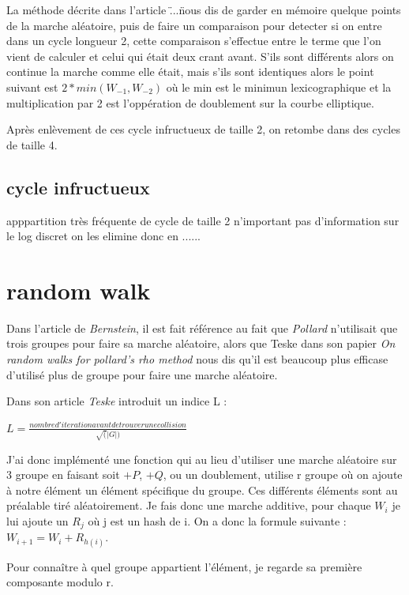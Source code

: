 \documentclass[a4paper,10pt]{report}
\begin{document}
La méthode décrite dans l'article \" ...\" nous dis de garder en mémoire quelque points de la marche aléatoire, puis de faire un comparaison pour detecter si on entre dans un cycle
longueur 2, cette comparaison s'effectue entre le terme que l'on vient de calculer et celui qui était deux crant avant.
S'ils sont différents alors on continue la marche comme elle était, mais s'ils sont identiques alors le point suivant est $2*min(W_{-1},W_{-2})$ où le min est le minimun lexicographique et
la multiplication par 2 est l'oppération de doublement sur la courbe elliptique.

Après enlèvement de ces cycle infructueux de taille 2, on retombe dans des cycles de taille 4.

\section{cycle infructueux}

apppartition très fréquente de cycle de taille 2 n'important pas d'information sur le log discret on les elimine donc en ......

\chapter{random walk}

Dans l'article de \textit{Bernstein}, il est fait référence au fait que \textit{Pollard} n'utilisait que trois groupes pour faire sa marche aléatoire, 
alors que Teske dans son papier \textit{On random walks for pollard's rho method} nous dis qu'il est beaucoup plus efficase d'utilisé plus de groupe 
pour faire une marche aléatoire.

Dans son article \textit{Teske} introduit un indice L :
\begin{center}
 $ L = \frac{nombre d'iteration avant de trouver une collision}{\sqrt(|G|)} $
\end{center}

J'ai donc implémenté une fonction qui au lieu d'utiliser une marche aléatoire sur 3 groupe en faisant soit $+P$, $+Q$, ou un doublement,
utilise r groupe où on ajoute à notre élément un élément spécifique du groupe. Ces différents éléments sont au préalable tiré aléatoirement.
Je fais donc une marche additive, pour chaque $W_i$ je lui ajoute un $R_j$ où j est un hash de i. On a donc la formule suivante : 
$ W_{i+1} = W_{i} + R_{h(i)} $.

Pour connaître à quel groupe appartient l'élément, je regarde sa première composante modulo r.
\end{document}
